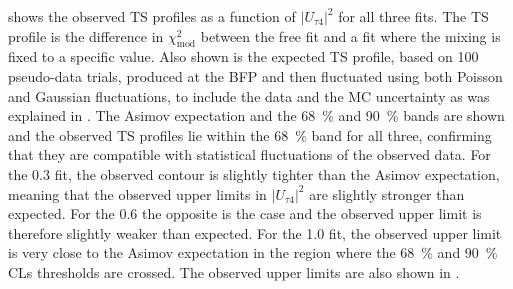  shows the observed TS profiles as a function of $|U_{\tau4}|^2$ for all three fits. The TS profile is the difference in $\chi^2_{\mathrm{mod}}$ between the free fit and a fit where the mixing is fixed to a specific value. Also shown is the expected TS profile, based on 100 pseudo-data trials, produced at the BFP and then fluctuated using both Poisson and Gaussian fluctuations, to include the data and the MC uncertainty as was explained in . The Asimov expectation and the \SI{68}{\percent} and \SI{90}{\percent} bands are shown and the observed TS profiles lie within the \SI{68}{\percent} band for all three, confirming that they are compatible with statistical fluctuations of the observed data. For the \SI{0.3}{\gev} fit, the observed contour is slightly tighter than the Asimov expectation, meaning that the observed upper limits in $|U_{\tau4}|^2$ are slightly stronger than expected. For the \SI{0.6}{\gev} the opposite is the case and the observed upper limit is therefore slightly weaker than expected. For the \SI{1.0}{\gev} fit, the observed upper limit is very close to the Asimov expectation in the region where the \SI{68}{\percent} and \SI{90}{\percent} CLs thresholds are crossed. The observed upper limits are also shown in .

